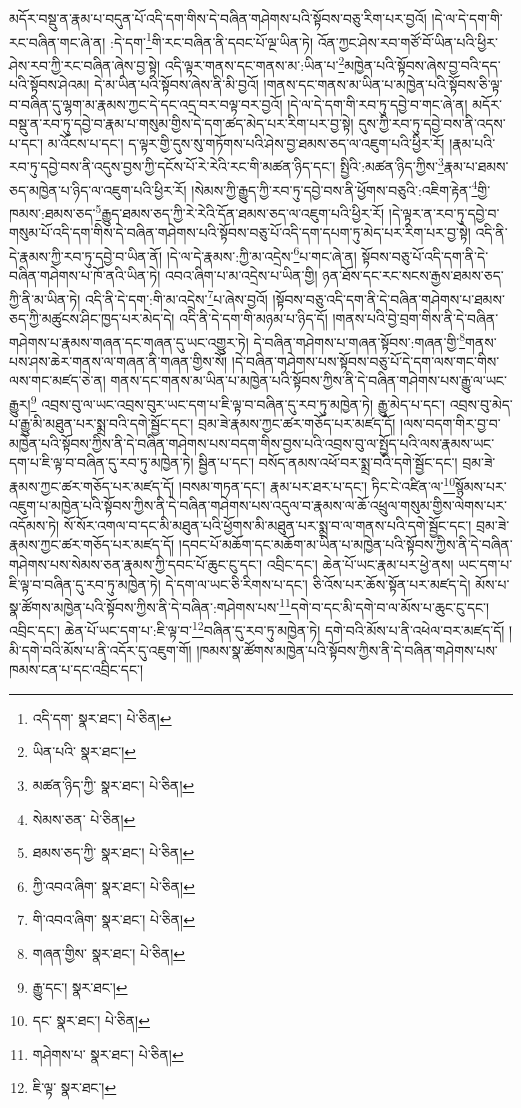 མདོར་བསྡུ་ན་རྣམ་པ་བདུན་པོ་འདི་དག་གིས་དེ་བཞིན་གཤེགས་པའི་སྟོབས་བཅུ་རིག་པར་བྱའོ། །དེ་ལ་དེ་དག་གི་རང་བཞིན་གང་ཞེ་ན། :དེ་དག་\footnote{འདི་དག་  སྣར་ཐང་།  པེ་ཅིན། }གི་རང་བཞིན་ནི་དབང་པོ་ལྔ་ཡིན་ཏེ། འོན་ཀྱང་ཤེས་རབ་གཙོ་བོ་ཡིན་པའི་ཕྱིར་ཤེས་རབ་ཀྱི་རང་བཞིན་ཞེས་བྱ་སྟེ། འདི་ལྟར་གནས་དང་གནས་མ་:ཡིན་པ་\footnote{ཡིན་པའི་  སྣར་ཐང་། }མཁྱེན་པའི་སྟོབས་ཞེས་བྱ་བའི་དད་པའི་སྟོབས་ཤེའམ། དེ་མ་ཡིན་པའི་སྟོབས་ཞེས་ནི་མི་བྱའོ། །གནས་དང་གནས་མ་ཡིན་པ་མཁྱེན་པའི་སྟོབས་ཅི་ལྟ་བ་བཞིན་དུ་ལྷག་མ་རྣམས་ཀྱང་དེ་དང་འདྲ་བར་བལྟ་བར་བྱའོ། །དེ་ལ་དེ་དག་གི་རབ་ཏུ་དབྱེ་བ་གང་ཞེ་ན། མདོར་བསྡུ་ན་རབ་ཏུ་དབྱེ་བ་རྣམ་པ་གསུམ་གྱིས་དེ་དག་ཚད་མེད་པར་རིག་པར་བྱ་སྟེ། དུས་ཀྱི་རབ་ཏུ་དབྱེ་བས་ནི་འདས་པ་དང་། མ་འོངས་པ་དང་། ད་ལྟར་གྱི་དུས་སུ་གཏོགས་པའི་ཤེས་བྱ་ཐམས་ཅད་ལ་འཇུག་པའི་ཕྱིར་རོ། །རྣམ་པའི་རབ་ཏུ་དབྱེ་བས་ནི་འདུས་བྱས་ཀྱི་དངོས་པོ་རེ་རེའི་རང་གི་མཚན་ཉིད་དང་། སྤྱིའི་:མཚན་ཉིད་ཀྱིས་\footnote{མཚན་ཉིད་ཀྱི་  སྣར་ཐང་།  པེ་ཅིན། }རྣམ་པ་ཐམས་ཅད་མཁྱེན་པ་ཉིད་ལ་འཇུག་པའི་ཕྱིར་རོ། །སེམས་ཀྱི་རྒྱུད་ཀྱི་རབ་ཏུ་དབྱེ་བས་ནི་ཕྱོགས་བཅུའི་:འཇིག་རྟེན་\footnote{སེམས་ཅན་  པེ་ཅིན། }གྱི་ཁམས་:ཐམས་ཅད་\footnote{ཐམས་ཅད་ཀྱི་  སྣར་ཐང་།  པེ་ཅིན། }རྒྱུད་ཐམས་ཅད་ཀྱི་རེ་རེའི་དོན་ཐམས་ཅད་ལ་འཇུག་པའི་ཕྱིར་རོ། །དེ་ལྟར་ན་རབ་ཏུ་དབྱེ་བ་གསུམ་པོ་འདི་དག་གིས་དེ་བཞིན་གཤེགས་པའི་སྟོབས་བཅུ་པོ་འདི་དག་དཔག་ཏུ་མེད་པར་རིག་པར་བྱ་སྟེ། འདི་ནི་དེ་རྣམས་ཀྱི་རབ་ཏུ་དབྱེ་བ་ཡིན་ནོ། །དེ་ལ་དེ་རྣམས་:ཀྱི་མ་འདྲེས་\footnote{ཀྱི་འབའ་ཞིག་  སྣར་ཐང་།  པེ་ཅིན། }པ་གང་ཞེ་ན། སྟོབས་བཅུ་པོ་འདི་དག་ནི་དེ་བཞིན་གཤེགས་པ་ཁོ་ནའི་ཡིན་ཏེ། འབའ་ཞིག་པ་མ་འདྲེས་པ་ཡིན་གྱི། ཉན་ཐོས་དང་རང་སངས་རྒྱས་ཐམས་ཅད་ཀྱི་ནི་མ་ཡིན་ཏེ། འདི་ནི་དེ་དག་:གི་མ་འདྲེས་\footnote{གི་འབའ་ཞིག་  སྣར་ཐང་།  པེ་ཅིན། }པ་ཞེས་བྱའོ། །སྟོབས་བཅུ་འདི་དག་ནི་དེ་བཞིན་གཤེགས་པ་ཐམས་ཅད་ཀྱི་མཚུངས་ཤིང་ཁྱད་པར་མེད་དེ། འདི་ནི་དེ་དག་གི་མཉམ་པ་ཉིད་དོ། །གནས་པའི་བྱེ་བྲག་གིས་ནི་དེ་བཞིན་གཤེགས་པ་རྣམས་གཞན་དང་གཞན་དུ་ཡང་འགྱུར་ཏེ། དེ་བཞིན་གཤེགས་པ་གཞན་སྟོབས་:གཞན་གྱི་\footnote{གཞན་གྱིས་  སྣར་ཐང་།  པེ་ཅིན། }གནས་པས་ཤས་ཆེར་གནས་ལ་གཞན་ནི་གཞན་གྱིས་སོ། །དེ་བཞིན་གཤེགས་པས་སྟོབས་བཅུ་པོ་དེ་དག་ལས་གང་གིས་ལས་གང་མཛད་ཅེ་ན། གནས་དང་གནས་མ་ཡིན་པ་མཁྱེན་པའི་སྟོབས་ཀྱིས་ནི་དེ་བཞིན་གཤེགས་པས་རྒྱུ་ལ་ཡང་རྒྱུར།\footnote{རྒྱུ་དང་།  སྣར་ཐང་། } འབྲས་བུ་ལ་ཡང་འབྲས་བུར་ཡང་དག་པ་ཇི་ལྟ་བ་བཞིན་དུ་རབ་ཏུ་མཁྱེན་ཏེ། རྒྱུ་མེད་པ་དང་། འབྲས་བུ་མེད་པ་རྒྱུ་མི་མཐུན་པར་སྨྲ་བའི་དགེ་སྦྱོང་དང་། བྲམ་ཟེ་རྣམས་ཀྱང་ཚར་གཅོད་པར་མཛད་དོ། །ལས་བདག་གིར་བྱ་བ་མཁྱེན་པའི་སྟོབས་ཀྱིས་ནི་དེ་བཞིན་གཤེགས་པས་བདག་གིས་བྱས་པའི་འབྲས་བུ་ལ་སྤྱོད་པའི་ལས་རྣམས་ཡང་དག་པ་ཇི་ལྟ་བ་བཞིན་དུ་རབ་ཏུ་མཁྱེན་ཏེ། སྦྱིན་པ་དང་། བསོད་ནམས་འཕོ་བར་སྨྲ་བའི་དགེ་སྦྱོང་དང་། བྲམ་ཟེ་རྣམས་ཀྱང་ཚར་གཅོད་པར་མཛད་དོ། །བསམ་གཏན་དང་། རྣམ་པར་ཐར་པ་དང་། ཏིང་ངེ་འཛིན་ལ་\footnote{དང་  སྣར་ཐང་།  པེ་ཅིན། }སྙོམས་པར་འཇུག་པ་མཁྱེན་པའི་སྟོབས་ཀྱིས་ནི་དེ་བཞིན་གཤེགས་པས་འདུལ་བ་རྣམས་ལ་ཆོ་འཕྲུལ་གསུམ་གྱིས་ལེགས་པར་འདོམས་ཏེ། སོ་སོར་འགལ་བ་དང་མི་མཐུན་པའི་ཕྱོགས་མི་མཐུན་པར་སྨྲ་བ་ལ་གནས་པའི་དགེ་སྦྱོང་དང་། བྲམ་ཟེ་རྣམས་ཀྱང་ཚར་གཅོད་པར་མཛད་དོ། །དབང་པོ་མཆོག་དང་མཆོག་མ་ཡིན་པ་མཁྱེན་པའི་སྟོབས་ཀྱིས་ནི་དེ་བཞིན་གཤེགས་པས་སེམས་ཅན་རྣམས་ཀྱི་དབང་པོ་ཆུང་ངུ་དང་། འབྲིང་དང་། ཆེན་པོ་ཡང་རྣམ་པར་ཕྱེ་ནས། ཡང་དག་པ་ཇི་ལྟ་བ་བཞིན་དུ་རབ་ཏུ་མཁྱེན་ཏེ། དེ་དག་ལ་ཡང་ཅི་རིགས་པ་དང་། ཅི་འོས་པར་ཆོས་སྟོན་པར་མཛད་དེ། མོས་པ་སྣ་ཚོགས་མཁྱེན་པའི་སྟོབས་ཀྱིས་ནི་དེ་བཞིན་:གཤེགས་པས་\footnote{གཤེགས་པ་  སྣར་ཐང་།  པེ་ཅིན། }དགེ་བ་དང་མི་དགེ་བ་ལ་མོས་པ་ཆུང་ངུ་དང་། འབྲིང་དང་། ཆེན་པོ་ཡང་དག་པ་:ཇི་ལྟ་བ་\footnote{ཇི་ལྟ་  སྣར་ཐང་། }བཞིན་དུ་རབ་ཏུ་མཁྱེན་ཏེ། དགེ་བའི་མོས་པ་ནི་འཕེལ་བར་མཛད་དོ། །མི་དགེ་བའི་མོས་པ་ནི་འདོར་དུ་འཇུག་གོ། །ཁམས་སྣ་ཚོགས་མཁྱེན་པའི་སྟོབས་ཀྱིས་ནི་དེ་བཞིན་གཤེགས་པས་ཁམས་ངན་པ་དང་འབྲིང་དང་། 